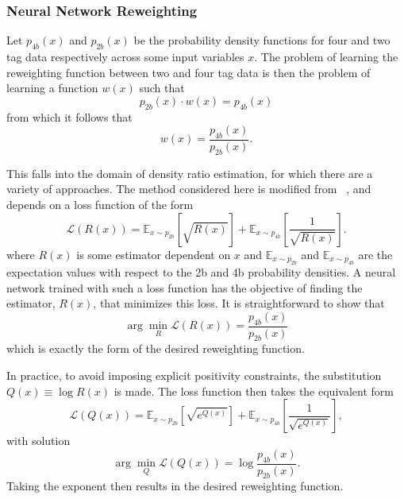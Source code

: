 \subsubsection{Neural Network Reweighting}
Let $p_{4b}(x)$ and $p_{2b}(x)$ be the probability density functions for four and two tag data respectively across 
some input variables $x$. The problem of learning the reweighting function between two and four tag data 
is then the problem of learning a function $w(x)$ such that
\begin{equation}
p_{2b}(x) \cdot w(x) = p_{4b}(x)
\end{equation}
from which it follows that
\begin{equation}
w(x) = \frac{p_{4b}(x)}{p_{2b}(x)}.
\end{equation}

This falls into the domain of density ratio estimation, for which there are a variety
of approaches. The method considered here is modified from ~\cite{NNloss, NNloss1}, and depends on
a loss function of the form
\begin{equation}
\mathcal{L}(R(x)) = \mathbb{E}_{x\sim p_{2b}}[\sqrt{R(x)}]
+\mathbb{E}_{x\sim p_{4b}}[\frac{1}{\sqrt{R(x)}}].
\end{equation}
where $R(x)$ is some estimator dependent on $x$ and $\mathbb{E}_{x\sim p_{2b}}$ and 
$\mathbb{E}_{x\sim p_{4b}}$ are the expectation values with respect to the 2b and 4b probability 
densities. A neural network trained with such a loss function has the objective of finding
the estimator, $R(x)$, that minimizes this loss. It is straightforward to show that
\begin{equation}
\arg \min_{R}\mathcal{L}(R(x)) = \frac{p_{4b}(x)}{p_{2b}(x)}
\end{equation}
which is exactly the form of the desired reweighting function.

In practice, to avoid imposing explicit positivity constraints, the substitution
$Q(x) \equiv \log R(x)$ is made. The loss function then takes the equivalent form
\begin{equation}
\mathcal{L}(Q(x)) = \mathbb{E}_{x\sim p_{2b}}[\sqrt{e^{Q(x)}}]
+\mathbb{E}_{x\sim p_{4b}}[\frac{1}{\sqrt{e^{Q(x)}}}],
\end{equation}
with solution
\begin{equation}
\arg \min_{Q}\mathcal{L}(Q(x)) = \log\frac{p_{4b}(x)}{p_{2b}(x)}.
\end{equation}
Taking the exponent then results in the desired reweighting function.

